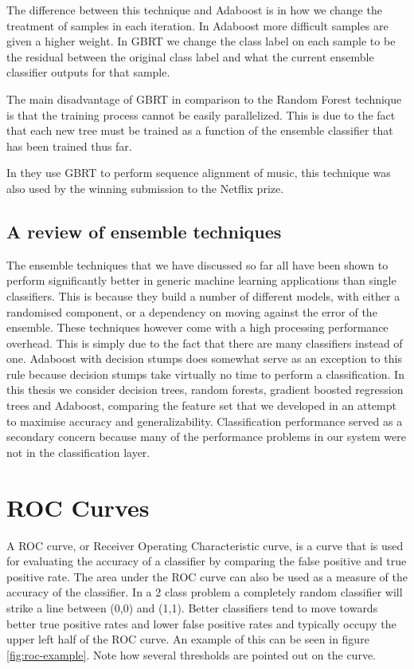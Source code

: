 \documentclass[ %
                    author={Sam Phippen},
                supervisor={Dr. Rafal Bogacz},
                     title={Real time voice activity detectors in noisy personal computing environments},
                  subtitle={},
                    degree={MEng},
                      year={2012} ]{thesis}
\begin{document}
The difference between this technique and Adaboost is in how we change the
treatment of samples in each iteration. In Adaboost more difficult samples are
given a higher weight. In GBRT we change the class label on each sample to be
the residual between the original class label and what the current ensemble
classifier outputs for that sample.

The main disadvantage of GBRT in comparison to the Random Forest technique is
that the training process cannot be easily parallelized. This is due to the
fact that each new tree must be trained as a function of the ensemble
classifier that has been trained thus far.

In \cite{parker} they use GBRT to perform sequence alignment of music, this
technique was also used by the winning submission to the Netflix prize.

\subsection{A review of ensemble techniques}

The ensemble techniques that we have discussed so far all have been shown to
perform significantly better in generic machine learning applications than
single classifiers. This is because they build a number of different models,
with either a randomised component, or a dependency on moving against the error
of the ensemble. These techniques however come with a high processing
performance overhead. This is simply due to the fact that there are many
classifiers instead of one. Adaboost with decision stumps does somewhat serve
as an exception to this rule because decision stumps take virtually no time to
perform a classification. In this thesis we consider decision trees, random
forests, gradient boosted regression trees and Adaboost, comparing the feature
set that we developed in an attempt to maximise accuracy and generalizability.
Classification performance  served as a secondary concern because many of the
performance problems in our system were not in the classification layer.

\section{ROC Curves}

A ROC curve, or Receiver Operating Characteristic curve, is a curve that is
used for evaluating the accuracy of a classifier by comparing the false
positive and true positive rate. The area under the ROC curve can also be used
as a measure of the accuracy of the classifier. In a 2 class problem a
completely random classifier will strike a line between (0,0) and (1,1). Better
classifiers tend to move towards better true positive rates and lower false
positive rates and typically occupy the upper left half of the ROC curve. An
example of this can be seen in figure \ref{fig:roc-example}. Note how several
thresholds are pointed out on the curve.
\end{document}
